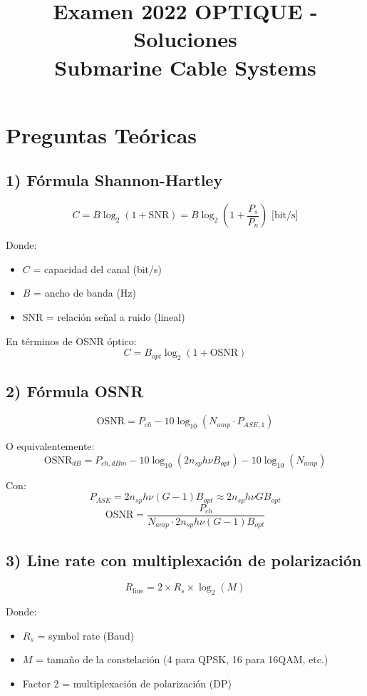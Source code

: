 \documentclass[a4paper,11pt]{article}
\title{\textbf{Examen 2022 OPTIQUE - Soluciones\\Submarine Cable Systems}}
\author{}
\date{}
\begin{document}
\maketitle

\section*{Preguntas Teóricas}

\subsection*{1) Fórmula Shannon-Hartley}
$$C = B \log_2\left(1 + \text{SNR}\right) = B \log_2\left(1 + \frac{P_s}{P_n}\right) \text{ [bit/s]}$$

Donde:
\begin{itemize}
    \item $C$ = capacidad del canal (bit/s)
    \item $B$ = ancho de banda (Hz)
    \item SNR = relación señal a ruido (lineal)
\end{itemize}

En términos de OSNR óptico:
$$C = B_{opt} \log_2(1 + \text{OSNR})$$

\subsection*{2) Fórmula OSNR}
$$\text{OSNR} = P_{ch} - 10\log_{10}(N_{amp} \cdot P_{ASE,1})$$

O equivalentemente:
$$\text{OSNR}_{dB} = P_{ch,dBm} - 10\log_{10}(2 n_{sp} h \nu B_{opt}) - 10\log_{10}(N_{amp})$$

Con:
$$P_{ASE} = 2 n_{sp} h \nu (G-1) B_{opt} \approx 2 n_{sp} h \nu G B_{opt}$$
$$\text{OSNR} = \frac{P_{ch}}{N_{amp} \cdot 2 n_{sp} h \nu (G-1) B_{opt}}$$

\subsection*{3) Line rate con multiplexación de polarización}
$$R_{\text{line}} = 2 \times R_s \times \log_2(M)$$

Donde:
\begin{itemize}
    \item $R_s$ = symbol rate (Baud)
    \item $M$ = tamaño de la constelación (4 para QPSK, 16 para 16QAM, etc.)
    \item Factor 2 = multiplexación de polarización (DP)
\end{itemize}
\end{document}
